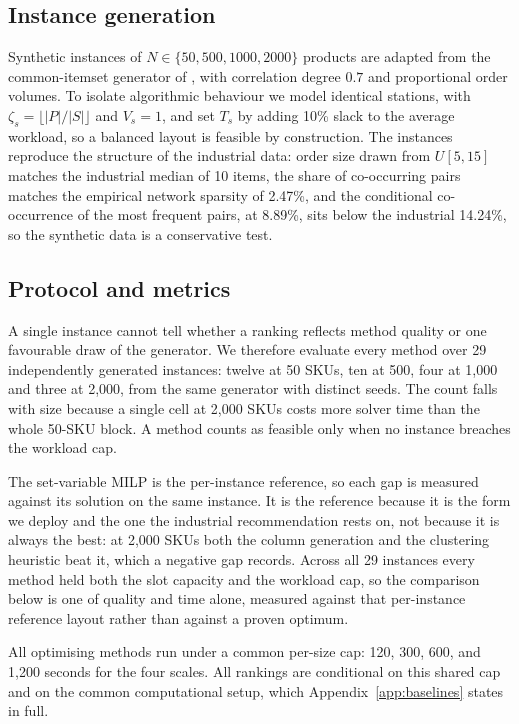 \documentclass[]{interact}
\begin{document}
\subsection{Instance generation}
Synthetic instances of $N \in \{50, 500, 1000, 2000\}$ products are adapted from the common-itemset generator of \citet{zhang2019cie}, with correlation degree $0.7$ and proportional order volumes. To isolate algorithmic behaviour we model identical stations, with $\zeta_s = \lfloor |P|/|S| \rfloor$ and $V_s = 1$, and set $T_s$ by adding 10\% slack to the average workload, so a balanced layout is feasible by construction. The instances reproduce the structure of the industrial data: order size drawn from $U[5,15]$ matches the industrial median of 10 items, the share of co-occurring pairs matches the empirical network sparsity of 2.47\%, and the conditional co-occurrence of the most frequent pairs, at 8.89\%, sits below the industrial 14.24\%, so the synthetic data is a conservative test.

\subsection{Protocol and metrics}
A single instance cannot tell whether a ranking reflects method quality or one favourable draw of the generator. We therefore evaluate every method over 29 independently generated instances: twelve at 50 SKUs, ten at 500, four at 1,000 and three at 2,000, from the same generator with distinct seeds. The count falls with size because a single cell at 2,000 SKUs costs more solver time than the whole 50-SKU block. A method counts as feasible only when no instance breaches the workload cap. 

The set-variable MILP is the per-instance reference, so each gap is measured against its solution on the same instance. It is the reference because it is the form we deploy and the one the industrial recommendation rests on, not because it is always the best: at 2,000 SKUs both the column generation and the clustering heuristic beat it, which a negative gap records. Across all 29 instances every method held both the slot capacity and the workload cap, so the comparison below is one of quality and time alone, measured against that per-instance reference layout rather than against a proven optimum.

All optimising methods run under a common per-size cap: 120, 300, 600, and 1,200 seconds for the four scales. All rankings are conditional on this shared cap and on the common computational setup, which Appendix~\ref{app:baselines} states in full.%
\end{document}
